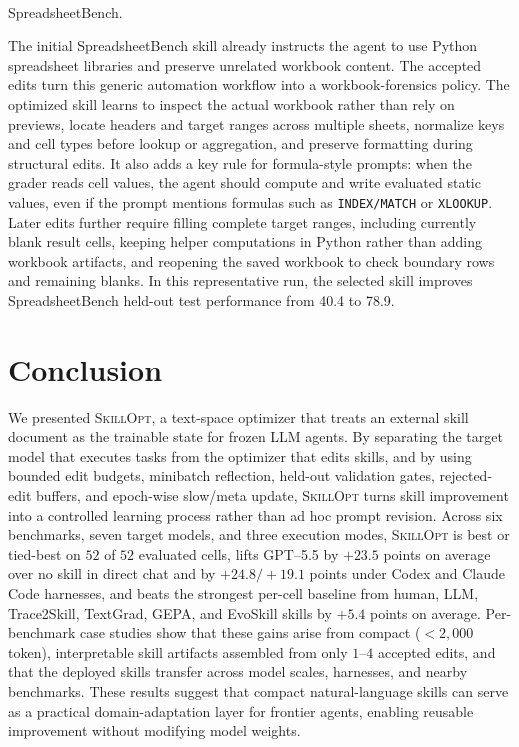 \documentclass[
]{article}
\makeatletter
\let\oldparagraph\paragraph
\renewcommand{\paragraph}{
    \@ifstar
      \xxxParagraphStar
      \xxxParagraphNoStar
  }
\newcommand{\xxxParagraphStar}[1]{\oldparagraph*{#1}\mbox{}}
\newcommand{\xxxParagraphNoStar}[1]{\oldparagraph{#1}\mbox{}}
\newcommand{\passthrough}[1]{#1}
\newcommand{\ourmethod}{\textsc{SkillOpt}\xspace}
\makeatother
\begin{document}
\paragraph{SpreadsheetBench.}\label{spreadsheetbench.}

The initial SpreadsheetBench skill already instructs the agent to use
Python spreadsheet libraries and preserve unrelated workbook content.
The accepted edits turn this generic automation workflow into a
workbook-forensics policy. The optimized skill learns to inspect the
actual workbook rather than rely on previews, locate headers and target
ranges across multiple sheets, normalize keys and cell types before
lookup or aggregation, and preserve formatting during structural edits.
It also adds a key rule for formula-style prompts: when the grader reads
cell values, the agent should compute and write evaluated static values,
even if the prompt mentions formulas such as
\passthrough{\lstinline!INDEX/MATCH!} or
\passthrough{\lstinline!XLOOKUP!}. Later edits further require filling
complete target ranges, including currently blank result cells, keeping
helper computations in Python rather than adding workbook artifacts, and
reopening the saved workbook to check boundary rows and remaining
blanks. In this representative run, the selected skill improves
SpreadsheetBench held-out test performance from 40.4 to 78.9.

\FloatBarrier

\section{Conclusion}\label{conclusion}

We presented \ourmethod{}, a text-space optimizer that treats an
external skill document as the trainable state for frozen LLM agents. By
separating the target model that executes tasks from the optimizer that
edits skills, and by using bounded edit budgets, minibatch reflection,
held-out validation gates, rejected-edit buffers, and epoch-wise
slow/meta update, \ourmethod{} turns skill improvement into a controlled
learning process rather than ad hoc prompt revision. Across six
benchmarks, seven target models, and three execution modes, \ourmethod{}
is best or tied-best on \(52\) of \(52\) evaluated cells, lifts GPT--5.5
by \(+23.5\) points on average over no skill in direct chat and by
\(+24.8 / +19.1\) points under Codex and Claude Code harnesses, and
beats the strongest per-cell baseline from human, LLM, Trace2Skill,
TextGrad, GEPA, and EvoSkill skills by \(+5.4\) points on average.
Per-benchmark case studies show that these gains arise from compact
(\(<2{,}000\) token), interpretable skill artifacts assembled from only
\(1\)--\(4\) accepted edits, and that the deployed skills transfer
across model scales, harnesses, and nearby benchmarks. These results
suggest that compact natural-language skills can serve as a practical
domain-adaptation layer for frontier agents, enabling reusable
improvement without modifying model weights.
\end{document}
